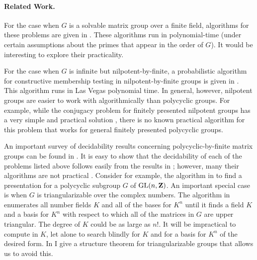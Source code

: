 \paragraph{Related Work.}
For the case when $G$ is a solvable matrix group over
a finite field,
algorithms for these problems are
given in \cite{Luks}.
These algorithms run in 
polynomial-time (under certain assumptions about the
primes that appear in the order of $G$).
It would be interesting to explore their practicality.

For the case when $G$ is infinite but nilpotent-by-finite,
a probabilistic 
algorithm for constructive membership testing
in nilpotent-by-finite groups is given in 
\cite{Beals:nilfin}.
This algorithm runs in Las Vegas polynomial time.
In general, however, nilpotent groups are easier to
work with algorithmically than polycyclic 
groups.  For example, 
while the conjugacy problem
for finitely presented nilpotent groups has a very simple
and practical solution \cite{Sims},
there is no known practical algorithm for 
this problem that works for general finitely presented 
polycyclic groups.

An important survey of decidability results 
concerning polycyclic-by-finite matrix groups
can be found in \cite{BCRS}.
It is easy to show that 
the decidability of each of the problems listed above
follows easily from the results in \cite{BCRS};
however, many their algorithms 
are not practical \cite{GO:thesis}.
Consider for example, the algorithm in \cite{BCRS}
to find a presentation for a polycyclic subgroup $G$
of $\mbox{GL} (n,{\bf Z})$.
An important special case is when $G$ is triangularizable
over the complex numbers.  
The algorithm in \cite{BCRS} enumerates all number
fields $K$ and all of the bases for $K^n$
until it finds a field $K$ and a basis for $K^n$
with respect to which all of the matrices in $G$
are upper triangular.
The degree of $K$ could be as large as $n!$.
It will be impractical to compute in $K$, let alone to 
search blindly for $K$ and for a basis for $K^n$
of the desired form.
In \cite{GO:thesis} I give a structure theorem
for triangularizable groups that allows us
to avoid this.

